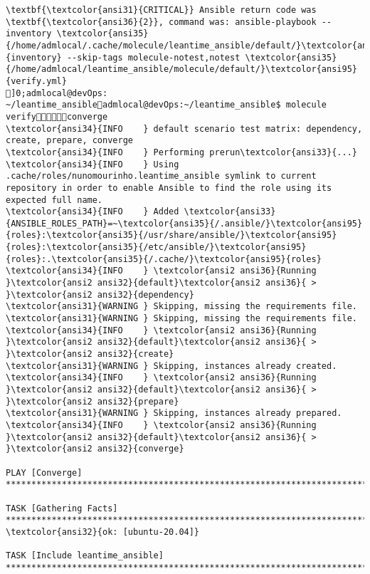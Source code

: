\documentclass{scrartcl}
\begin{document}
\begin{Verbatim}
\textbf{\textcolor{ansi31}{CRITICAL}} Ansible return code was \textbf{\textcolor{ansi36}{2}}, command was: ansible-playbook --inventory \textcolor{ansi35}{/home/admlocal/.cache/molecule/leantime_ansible/default/}\textcolor{ansi95}{inventory} --skip-tags molecule-notest,notest \textcolor{ansi35}{/home/admlocal/leantime_ansible/molecule/default/}\textcolor{ansi95}{verify.yml}
]0;admlocal@devOps: ~/leantime_ansibleadmlocal@devOps:~/leantime_ansible$ molecule verifyconverge
\textcolor{ansi34}{INFO    } default scenario test matrix: dependency, create, prepare, converge
\textcolor{ansi34}{INFO    } Performing prerun\textcolor{ansi33}{...}
\textcolor{ansi34}{INFO    } Using .cache/roles/nunomourinho.leantime_ansible symlink to current repository in order to enable Ansible to find the role using its expected full name.
\textcolor{ansi34}{INFO    } Added \textcolor{ansi33}{ANSIBLE_ROLES_PATH}=~\textcolor{ansi35}{/.ansible/}\textcolor{ansi95}{roles}:\textcolor{ansi35}{/usr/share/ansible/}\textcolor{ansi95}{roles}:\textcolor{ansi35}{/etc/ansible/}\textcolor{ansi95}{roles}:.\textcolor{ansi35}{/.cache/}\textcolor{ansi95}{roles}
\textcolor{ansi34}{INFO    } \textcolor{ansi2 ansi36}{Running }\textcolor{ansi2 ansi32}{default}\textcolor{ansi2 ansi36}{ > }\textcolor{ansi2 ansi32}{dependency}
\textcolor{ansi31}{WARNING } Skipping, missing the requirements file.
\textcolor{ansi31}{WARNING } Skipping, missing the requirements file.
\textcolor{ansi34}{INFO    } \textcolor{ansi2 ansi36}{Running }\textcolor{ansi2 ansi32}{default}\textcolor{ansi2 ansi36}{ > }\textcolor{ansi2 ansi32}{create}
\textcolor{ansi31}{WARNING } Skipping, instances already created.
\textcolor{ansi34}{INFO    } \textcolor{ansi2 ansi36}{Running }\textcolor{ansi2 ansi32}{default}\textcolor{ansi2 ansi36}{ > }\textcolor{ansi2 ansi32}{prepare}
\textcolor{ansi31}{WARNING } Skipping, instances already prepared.
\textcolor{ansi34}{INFO    } \textcolor{ansi2 ansi36}{Running }\textcolor{ansi2 ansi32}{default}\textcolor{ansi2 ansi36}{ > }\textcolor{ansi2 ansi32}{converge}

PLAY [Converge] **************************************************************************************************************************

TASK [Gathering Facts] *******************************************************************************************************************
\textcolor{ansi32}{ok: [ubuntu-20.04]}

TASK [Include leantime_ansible] **********************************************************************************************************


\end{Verbatim}
\end{document}
